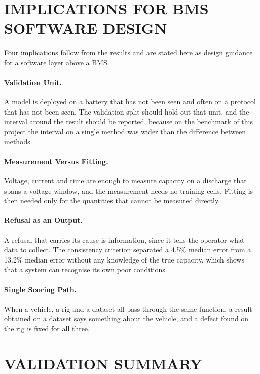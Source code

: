 \documentclass[12pt,a4paper]{amritareport}
\begin{document}
\section{IMPLICATIONS FOR BMS SOFTWARE DESIGN}

Four implications follow from the results and are stated here as design guidance for a software layer above a BMS.

\paragraph{Validation Unit.} A model is deployed on a battery that has not been seen and often on a protocol that has not been seen. The validation split should hold out that unit, and the interval around the result should be reported, because on the benchmark of this project the interval on a single method was wider than the difference between methods.

\paragraph{Measurement Versus Fitting.} Voltage, current and time are enough to measure capacity on a discharge that spans a voltage window, and the measurement needs no training cells. Fitting is then needed only for the quantities that cannot be measured directly.

\paragraph{Refusal as an Output.} A refusal that carries its cause is information, since it tells the operator what data to collect. The consistency criterion separated a 4.5\% median error from a 13.2\% median error without any knowledge of the true capacity, which shows that a system can recognise its own poor conditions.

\paragraph{Single Scoring Path.} When a vehicle, a rig and a dataset all pass through the same function, a result obtained on a dataset says something about the vehicle, and a defect found on the rig is fixed for all three.

\section{VALIDATION SUMMARY}
\end{document}
